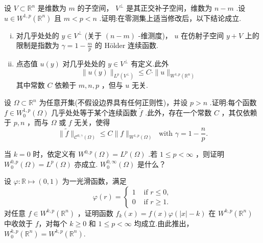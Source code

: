 \begin{rbhw}
设 $V \subset  {\mathbb{R}}^{n}$ 是维数为 $m$ 的子空间， ${V}^{ \bot  }$ 是其正交补子空间，维数为 $n - m$ .设 $u \in  {W}^{1,p}\left( {\mathbb{R}}^{n}\right)$ 且 $m < p < n$ .证明:在零测集上适当修改后，以下结论成立.
\begin{enumerate}[(i)]
    \item 对几乎处处的 $y \in  {V}^{ \bot  }$ (关于 $\left( {n - m}\right)$ -维测度)， $u$ 在仿射子空间 $y + V$ 上的限制是指数为 $\gamma  = 1 - \frac{m}{p}$ 的 Hölder 连续函数.
    \item 点态值 $u\left( y\right)$ 对几乎处处的 $y \in  {V}^{ \bot  }$ 有定义.此外
\[
\| u\left( y\right) {\| }_{{L}^{p}\left( {V}^{ \bot  }\right) } \leq  C \cdot  \| u{\| }_{{W}^{1,p}\left( {\mathbb{R}}^{n}\right) }
\]
其中常数 $C$ 依赖于 $m,n,p$ ，但与 $u$ 无关.
\end{enumerate}
\end{rbhw}

\begin{rbhw}
设 $\Omega  \subset  {\mathbb{R}}^{n}$ 为任意开集(不假设边界具有任何正则性)，并设 $p > n$ .证明:每个函数 $f \in  {W}_{0}^{1,p}\left( \Omega \right)$ 几乎处处等于某个连续函数 $\widetilde{f}$ .此外，存在一个常数 $C$ ，其仅依赖于 $p,n$ ，而与 $\Omega$ 或 $f$ 无关，使得
\[
\| \widetilde{f}{\| }_{{\mathcal{C}}^{0,\gamma }\left( \Omega \right) } \leq  C\| f{\| }_{{W}^{1,p}\left( \Omega \right) }\;\text{ with }\gamma  = 1 - \frac{n}{p}.
\]
\end{rbhw}

\begin{rbhw}
当 $k = 0$ 时，依定义有 ${W}^{0,p}\left( \Omega \right)  = {L}^{p}\left( \Omega \right)$ .若 $1 \leq  p < \infty$ ，则证明 ${W}_{0}^{0,p}\left( \Omega \right)  = {L}^{p}\left( \Omega \right)$ 亦成立. ${W}_{0}^{0,\infty }\left( \Omega \right)$ 是什么？
\end{rbhw}

\begin{rbhw}
设 $\varphi  : \mathbb{R} \mapsto  \left(  {0,1}\right)$ 为一光滑函数，满足
\[
\varphi \left( r\right)  =\begin{cases} 1 & \text{ if }r \leq  0, \\  0 & \text{ if }r \geq  1. \end{cases}
\]
对任意 $f \in  {W}^{k,p}\left( {\mathbb{R}}^{n}\right)$ ，证明函数 ${f}_{k}\left( x\right)  = f\left( x\right) \varphi \left( {\left| x\right|  - k}\right)$ 在 ${W}^{k,p}\left( {\mathbb{R}}^{n}\right)$ 中收敛于 $f$，对每个 $k \geq  0$ 和 $1 \leq  p < \infty$ 均成立.由此推出， ${W}_{0}^{k,p}\left( {\mathbb{R}}^{n}\right)  = {W}^{k,p}\left( {\mathbb{R}}^{n}\right) .$
\end{rbhw}

